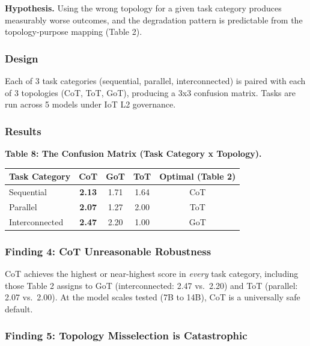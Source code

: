 \documentclass[11pt,a4paper]{article}
\begin{document}
\textbf{Hypothesis.} Using the wrong topology for a given task category
produces measurably worse outcomes, and the degradation pattern is
predictable from the topology-purpose mapping (Table 2).

\subsubsection{Design}\label{design-1}

Each of 3 task categories (sequential, parallel, interconnected) is
paired with each of 3 topologies (CoT, ToT, GoT), producing a 3x3
confusion matrix. Tasks are run across 5 models under IoT L2 governance.

\subsubsection{Results}\label{results-2}

\textbf{Table 8: The Confusion Matrix (Task Category x Topology).}

{\small\begin{longtable}[]{@{}lcccc@{}}
\toprule\noalign{}
Task Category & CoT & GoT & ToT & Optimal (Table 2) \\
\midrule\noalign{}
\endhead
\bottomrule\noalign{}
\endlastfoot
Sequential & \textbf{2.13} & 1.71 & 1.64 & CoT \\
Parallel & \textbf{2.07} & 1.27 & 2.00 & ToT \\
Interconnected & \textbf{2.47} & 2.20 & 1.00 & GoT \\
\end{longtable}}

\subsubsection{Finding 4: CoT Unreasonable
Robustness}\label{finding-4-cot-unreasonable-robustness}

CoT achieves the highest or near-highest score in \emph{every} task
category, including those Table 2 assigns to GoT (interconnected: 2.47
vs.~2.20) and ToT (parallel: 2.07 vs.~2.00). At the model scales tested
(7B to 14B), CoT is a universally safe default.

\subsubsection{Finding 5: Topology Misselection is
Catastrophic}\label{finding-5-topology-misselection-is-catastrophic}
\end{document}
